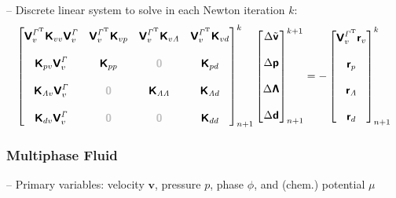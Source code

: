 \documentclass[a4paper,12pt]{report}
\newcommand{\bs}[1]{\boldsymbol{#1}}
\newcommand{\Gm}{\mathit{\Gamma}}
\newcommand{\zerom}{\textcolor{lightgray}{\bs{\mathsf{0}}}}
\newcommand{\ROP}{\bs{\mathsf{r}}}
\newcommand{\LMZ}{\bs{\mathsf{\Lambda}}}
\newcommand{\lmzi}{\mathit{\Lambda}} %
\begin{document}
-- Discrete linear system to solve in each Newton iteration $k$:
\begin{equation}
\label{equation-lin-sys-frsi-0d}
\begin{aligned}
\begin{bmatrix} \boldsymbol{\mathsf{V}}_{v}^{\Gm^\mathrm{T}}\boldsymbol{\mathsf{K}}_{vv}\boldsymbol{\mathsf{V}}_{v}^{\Gm} & \boldsymbol{\mathsf{V}}_{v}^{\Gm^\mathrm{T}}\boldsymbol{\mathsf{K}}_{vp} & \boldsymbol{\mathsf{V}}_{v}^{\Gm^\mathrm{T}}\boldsymbol{\mathsf{K}}_{v\lmzi} & \boldsymbol{\mathsf{V}}_{v}^{\Gm^\mathrm{T}}\boldsymbol{\mathsf{K}}_{vd} \\ \\ \boldsymbol{\mathsf{K}}_{pv}\boldsymbol{\mathsf{V}}_{v}^{\Gm} & \boldsymbol{\mathsf{K}}_{pp} & \zerom & \boldsymbol{\mathsf{K}}_{pd} \\ \\ \boldsymbol{\mathsf{K}}_{\lmzi v}\boldsymbol{\mathsf{V}}_{v}^{\Gm} & \zerom & \boldsymbol{\mathsf{K}}_{\lmzi \lmzi} & \boldsymbol{\mathsf{K}}_{\lmzi d} \\ \\ \boldsymbol{\mathsf{K}}_{dv}\boldsymbol{\mathsf{V}}_{v}^{\Gm}  & \zerom & \zerom & \boldsymbol{\mathsf{K}}_{dd} \end{bmatrix}_{n+1}^{k}\begin{bmatrix} \Delta\tilde{\boldsymbol{\mathsf{v}}} \\ \\ \Delta\boldsymbol{\mathsf{p}} \\ \\ \Delta\LMZ \\ \\ \Delta\boldsymbol{\mathsf{d}} \end{bmatrix}_{n+1}^{k+1}=-\begin{bmatrix} \boldsymbol{\mathsf{V}}_{v}^{\Gm^\mathrm{T}}\ROP_{v} \\ \\ \ROP_{p} \\ \\ \ROP_{\lmzi} \\ \\ \ROP_{d}\end{bmatrix}_{n+1}^{k}
\end{aligned}
\end{equation}

\clearpage
\subsubsection{Multiphase Fluid}\label{fluid-multiphase}
-- Primary variables: velocity $\boldsymbol{v}$, pressure $p$, phase $\phi$, and (chem.) potential $\mu$\\
\end{document}
